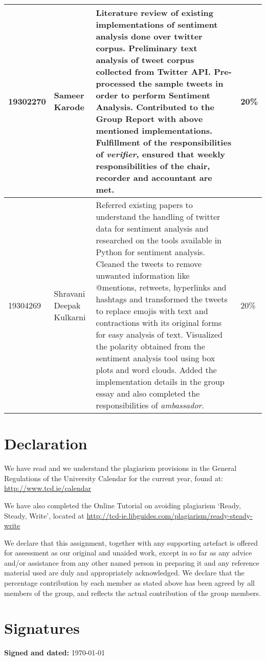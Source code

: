 \documentclass[a4paper,10pt]{article}
\begin{document}
\begin{tabular}{ | p{2cm} | p{2cm} | p{10cm} | l | }
19302270 & Sameer Karode & Literature review of existing implementations of sentiment analysis done over twitter corpus. Preliminary text analysis of tweet corpus collected from Twitter API. Pre-processed the sample tweets in order to perform Sentiment Analysis. Contributed to the Group Report with above mentioned implementations. Fulfillment of the responsibilities of \textit{verifier}, ensured that weekly responsibilities of the chair, recorder and accountant are met. & 20\% \\ \hline
19304269 & Shravani Deepak Kulkarni & Referred existing papers to understand the handling of twitter data for sentiment analysis and researched on the tools available in Python for sentiment analysis. Cleaned the tweets to remove unwanted information like @mentions, retweets, hyperlinks and hashtags and transformed the tweets to replace emojis with text and contractions with its original forms for easy analysis of text. Visualized the polarity obtained from the sentiment analysis tool using box plots and word clouds. Added the implementation details in the group essay and also completed the responsibilities of \textit{ambassador}. & 20\% \\ \hline
\end{tabular}

\section{Declaration}
We have read and we understand the plagiarism provisions in the General Regulations of the University Calendar for the current year, found at: \url{http://www.tcd.ie/calendar}

We have also completed the Online Tutorial on avoiding plagiarism ‘Ready, Steady, Write’, located at \url{http://tcd-ie.libguides.com/plagiarism/ready-steady-write}

We  declare  that  this  assignment, together with any supporting artefact is offered for assessment as our original and unaided work, except in so far as any advice and/or assistance from any other named person in preparing it and any reference material used are duly and appropriately acknowledged. We declare that the percentage contribution by each member as stated above has been agreed by all members of the group, and reflects the actual contribution of the group members.

\section{Signatures}
\textbf{Signed and dated:} \today
\end{document}
